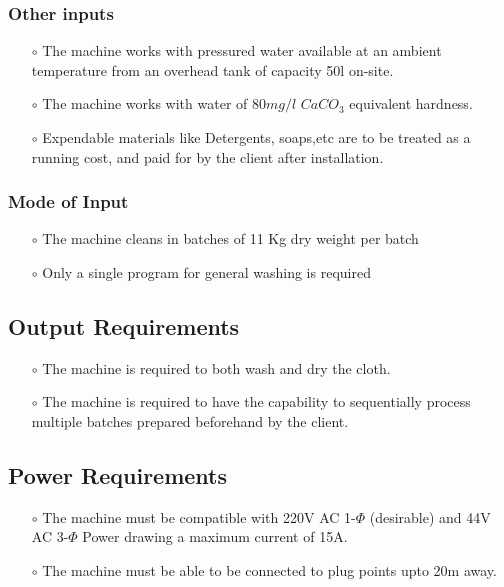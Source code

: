 \documentclass[12pt]{article}
\begin{document}
\subsubsection{Other inputs}
\begin{itemize}
    \item[$\scriptstyle\circ$] The machine works with pressured water available at an ambient temperature from an overhead tank of capacity 50l on-site.
    \item[$\scriptstyle\circ$] The machine works with water of $80mg/l$ $CaCO_3$ equivalent hardness.
    \item[$\scriptstyle\circ$] Expendable materials like Detergents, soaps,etc are to be treated as a running cost, and paid for by the client after installation.
\end{itemize}
\subsubsection{Mode of Input}
\begin{itemize}
    \item[$\scriptstyle\circ$] The machine cleans in batches of 11 Kg dry weight per batch
    \item[$\scriptstyle\circ$] Only a single program for general washing is required
\end{itemize}

\subsection{Output Requirements}
\begin{itemize}
    \item[$\scriptstyle\circ$] The machine is required to both wash and dry the cloth.
    \item[$\scriptstyle\circ$] The machine is required to have the capability to sequentially process multiple batches prepared beforehand by the client.
\end{itemize}
\subsection{Power Requirements}
\begin{itemize}
    \item[$\scriptstyle\circ$] The machine must be compatible with 220V AC 1-$\Phi$ (desirable) and 44V AC 3-$\Phi$ Power drawing a maximum current of 15A.
    \item[$\scriptstyle\circ$] The machine must be able to be connected to plug points upto 20m away.
\end{itemize}
\end{document}
